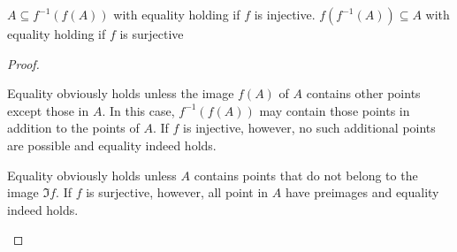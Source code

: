 \begin{proposition}\label{thm:function_image_preimage_composition}\mbox{}
  \begin{propenum}
     \( A \subseteq f^{-1}(f(A)) \) with equality holding if \( f \) is injective.
     \( f(f^{-1}(A)) \subseteq A \) with equality holding if \( f \) is surjective
  \end{propenum}
\end{proposition}
\begin{proof}\mbox{}
  \begin{description}
     Equality obviously holds unless the image \( f(A) \) of \( A \) contains other points except those in \( A \). In this case, \( f^{-1}(f(A)) \) may contain those points in addition to the points of \( A \). If \( f \) is injective, however, no such additional points are possible and equality indeed holds.

     Equality obviously holds unless \( A \) contains points that do not belong to the image \( \Im f \). If \( f \) is surjective, however, all point in \( A \) have preimages and equality indeed holds.
  \end{description}
\end{proof}


